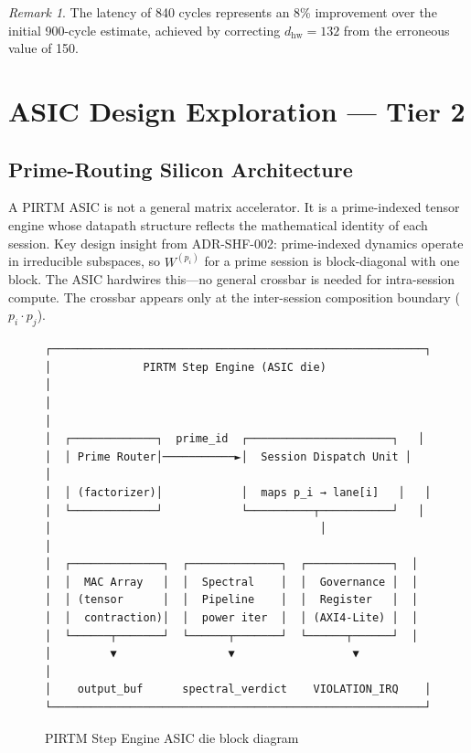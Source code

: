 \documentclass[12pt,letterpaper]{article}
\theoremstyle{plain}
\theoremstyle{definition}
\theoremstyle{remark}
\newtheorem{remark}[theorem]{Remark}
\begin{document}
\begin{remark}
The latency of 840 cycles represents an 8\% improvement over the initial 900-cycle
estimate, achieved by correcting \(d_{\mathrm{hw}} = 132\) from the erroneous
value of 150.
\end{remark}

\section{ASIC Design Exploration --- Tier 2}

\subsection{Prime-Routing Silicon Architecture}

A PIRTM ASIC is not a general matrix accelerator. It is a prime-indexed tensor
engine whose datapath structure reflects the mathematical identity of each session.
Key design insight from ADR-SHF-002: prime-indexed dynamics operate in irreducible
subspaces, so \(W^{(p_i)}\) for a prime session is block-diagonal with one block.
The ASIC hardwires this---no general crossbar is needed for intra-session compute.
The crossbar appears only at the inter-session composition boundary
(\(p_i \cdot p_j\)).

\begin{figure}[H]
\centering
\begin{minipage}{0.85\textwidth}
\begin{verbatim}
┌─────────────────────────────────────────────────────────┐
│              PIRTM Step Engine (ASIC die)                │
│                                                          │
│  ┌─────────────┐  prime_id  ┌──────────────────────┐   │
│  │ Prime Router│───────────►│  Session Dispatch Unit │   │
│  │ (factorizer)│            │  maps p_i → lane[i]   │   │
│  └─────────────┘            └──────────┬───────────┘   │
│                                         │                │
│  ┌──────────────┐  ┌──────────────┐  ┌─────────────┐  │
│  │  MAC Array   │  │  Spectral    │  │  Governance │  │
│  │ (tensor      │  │  Pipeline    │  │  Register   │  │
│  │  contraction)│  │  power iter  │  │ (AXI4-Lite) │  │
│  └──────┬───────┘  └──────┬───────┘  └──────┬──────┘  │
│         ▼                 ▼                  ▼           │
│    output_buf      spectral_verdict    VIOLATION_IRQ    │
└─────────────────────────────────────────────────────────┘
\end{verbatim}
\end{minipage}
\caption{PIRTM Step Engine ASIC die block diagram}
\label{fig:asic}
\end{figure}
\end{document}
